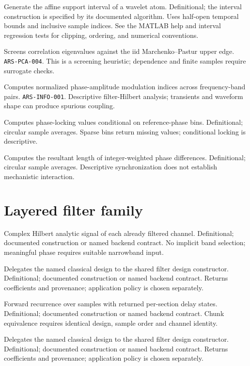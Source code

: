 {Generate the affine support interval of a wavelet atom.}
{Definitional; the interval construction is specified by its documented algorithm.}
{Uses half-open temporal bounds and inclusive sample indices. See the MATLAB help and interval regression tests for clipping, ordering, and numerical conventions.}

{Screens correlation eigenvalues against the iid Marchenko--Pastur upper edge.}
{\texttt{ARS-PCA-004}.}
{This is a screening heuristic; dependence and finite samples require surrogate checks.}

{Computes normalized phase-amplitude modulation indices across frequency-band pairs.}
{\texttt{ARS-INFO-001}.}
{Descriptive filter-Hilbert analysis; transients and waveform shape can produce spurious coupling.}

{Computes phase-locking values conditional on reference-phase bins.}
{Definitional; circular sample averages.}
{Sparse bins return missing values; conditional locking is descriptive.}

{Computes the resultant length of integer-weighted phase differences.}
{Definitional; circular sample averages.}
{Descriptive synchronization does not establish mechanistic interaction.}

\section{Layered filter family}
{Complex Hilbert analytic signal of each already filtered channel.}
{Definitional; documented construction or named backend contract.}
{No implicit band selection; meaningful phase requires suitable narrowband input.}

{Delegates the named classical design to the shared filter design constructor.}
{Definitional; documented construction or named backend contract.}
{Returns coefficients and provenance; application policy is chosen separately.}

{Forward recurrence over samples with returned per-section delay states.}
{Definitional; documented construction or named backend contract.}
{Chunk equivalence requires identical design, sample order and channel identity.}

{Delegates the named classical design to the shared filter design constructor.}
{Definitional; documented construction or named backend contract.}
{Returns coefficients and provenance; application policy is chosen separately.}

